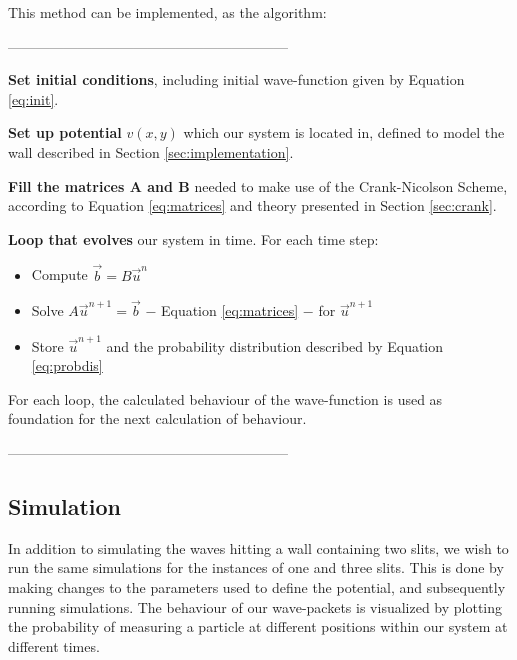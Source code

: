 \documentclass[10pt, nofootinbib, twocolumn]{revtex4-1}
\begin{document}
\cleardoublepage
This method can be implemented, as the algorithm:\\
\begin{center} ------------------------------------------------------------ \end{center}
\begin{description}[]
    \item \textbf{Set initial conditions}, including initial wave-function given by Equation \eqref{eq:init}.
    \item \textbf{Set up potential} \( v(x, y) \) which our system is located in, defined to model the wall described in Section \ref{sec:implementation}. 
    \item \textbf{Fill the matrices A and B} needed to make use of the Crank-Nicolson Scheme, according to Equation \eqref{eq:matrices} and theory presented in Section \ref{sec:crank}.
    \item \textbf{Loop that evolves} our system in time. For each time step:
    \begin{itemize}
        \item Compute  \( \vec{b} = B \vec{u}^n \)
        \item Solve \( A \vec{u}^{n+1} = \vec{b} \) $-$ Equation \eqref{eq:matrices} $-$ for \( \vec{u}^{n+1} \)
        \item Store \( \vec{u}^{n+1} \) and the probability distribution described by Equation
        \eqref{eq:probdis}
    \end{itemize}
\end{description}
For each loop, the calculated behaviour of the wave-function is used as foundation for the next calculation of behaviour. 
\begin{center} ------------------------------------------------------------ \end{center}


\subsection{Simulation}
In addition to simulating the waves hitting a wall containing two slits, we wish to run the same simulations for the instances of one and three slits. This is done by making changes to the parameters used to define the potential, and subsequently running simulations. The behaviour of our wave-packets is visualized by plotting the probability of measuring a particle at different positions within our system at different times. 

\newpage
\end{document}
